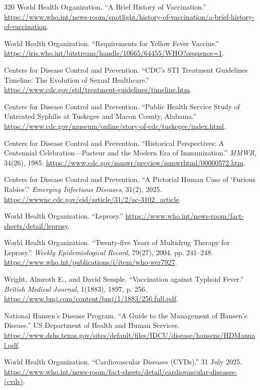 \documentclass[12pt,oneside]{book}
\begin{document}
\begin{thebibliography}{320}
World Health Organization. ``A Brief History of Vaccination.''
\url{https://www.who.int/news-room/spotlight/history-of-vaccination/a-brief-history-of-vaccination}.

World Health Organization. ``Requirements for Yellow Fever Vaccine.''
\url{https://iris.who.int/bitstream/handle/10665/64455/WHO?sequence=1}.

Centers for Disease Control and Prevention. ``CDC's STI Treatment Guidelines
Timeline: The Evolution of Sexual Healthcare.''
\url{https://www.cdc.gov/std/treatment-guidelines/timeline.htm}.

Centers for Disease Control and Prevention. ``Public Health Service Study of
Untreated Syphilis at Tuskegee and Macon County, Alabama.''
\url{https://www.cdc.gov/museum/online/story-of-cdc/tuskegee/index.html}.

Centers for Disease Control and Prevention. ``Historical Perspectives: A
Centennial Celebration---Pasteur and the Modern Era of Immunization.''
\emph{MMWR}, 34(26), 1985.
\url{https://www.cdc.gov/mmwr/preview/mmwrhtml/00000572.htm}.

Centers for Disease Control and Prevention. ``A Pictorial Human Case of
`Furious Rabies'.'' \emph{Emerging Infectious Diseases}, 31(2), 2025.
\url{https://wwwnc.cdc.gov/eid/article/31/2/ac-3102_article}.

World Health Organization. ``Leprosy.''
\url{https://www.who.int/news-room/fact-sheets/detail/leprosy}.

World Health Organization. ``Twenty-five Years of Multidrug Therapy for
Leprosy.'' \emph{Weekly Epidemiological Record}, 79(27), 2004, pp. 241--248.
\url{https://www.who.int/publications/i/item/who-wer7927}.

Wright, Almroth E., and David Semple. ``Vaccination against Typhoid Fever.''
\emph{British Medical Journal}, 1(1883), 1897, p. 256.
\url{https://www.bmj.com/content/bmj/1/1883/256.full.pdf}.

National Hansen's Disease Program. ``A Guide to the Management of Hansen's
Disease.'' US Department of Health and Human Services.
\url{https://www.dshs.texas.gov/sites/default/files/IDCU/disease/hansens/HDManual.pdf}.

World Health Organization. ``Cardiovascular Diseases (CVDs).'' 31 July 2025.
\url{https://www.who.int/news-room/fact-sheets/detail/cardiovascular-diseases-(cvds)}.


\end{thebibliography}
\end{document}
